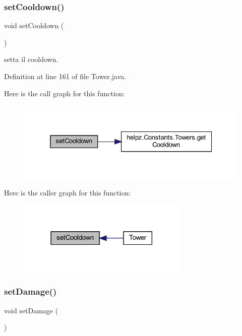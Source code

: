 \subsubsection{\texorpdfstring{set\+Cooldown()}{setCooldown()}}
{\footnotesize\ttfamily void set\+Cooldown (\begin{DoxyParamCaption}{ }\end{DoxyParamCaption})\hspace{0.3cm}{\ttfamily [private]}}



setta il cooldown. 



Definition at line 161 of file Tower.\+java.

Here is the call graph for this function\+:\nopagebreak
\begin{figure}[H]
\begin{center}
\leavevmode
\includegraphics[width=325pt]{classtowers_1_1_tower_a120aaa641fb05cbcbe27057048519fa7_cgraph}
\end{center}
\end{figure}
Here is the caller graph for this function\+:\nopagebreak
\begin{figure}[H]
\begin{center}
\leavevmode
\includegraphics[width=230pt]{classtowers_1_1_tower_a120aaa641fb05cbcbe27057048519fa7_icgraph}
\end{center}
\end{figure}
\mbox{\label{classtowers_1_1_tower_a342d428cb4c655ed4d92a2c5be287e5d}} 
\subsubsection{\texorpdfstring{set\+Damage()}{setDamage()}}
{\footnotesize\ttfamily void set\+Damage (\begin{DoxyParamCaption}{ }\end{DoxyParamCaption})\hspace{0.3cm}{\ttfamily [private]}}



